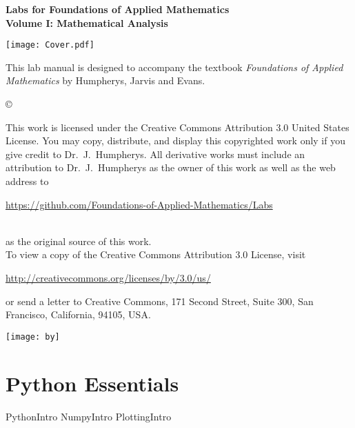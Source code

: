 \documentclass[nociteref]{SIAM-GH-book}
\begin{document}

\thispagestyle{empty} %

\begin{center}
{\huge \bf Labs for Foundations of Applied Mathematics} \\
\vspace{5mm}
{\Large \bf Volume I: Mathematical Analysis}
\vspace{20mm}

\texttt{[image: Cover.pdf]}
\end{center}
\frontmatter



\begin{thepreface} %

This lab manual is designed to accompany the textbook \emph{Foundations of Applied Mathematics} by Humpherys, Jarvis and Evans.

\vfill
\copyright{This work is licensed under the Creative Commons Attribution 3.0 United States
License.  You may copy, distribute, and display this copyrighted work only if you give
credit to Dr.~J.~Humpherys. All derivative works must include an attribution to Dr.~J.~Humpherys as the owner of this work as well as the web address to
\\\centerline{\url{https://github.com/Foundations-of-Applied-Mathematics/Labs}}\\as the original source of this work.
\\To view a copy of the Creative Commons Attribution 3.0 License, visit
\\\centerline{\url{http://creativecommons.org/licenses/by/3.0/us/}} or send a letter to Creative Commons, 171 Second Street, Suite 300, San Francisco, California, 94105, USA.}

\vfill
\centering\texttt{[image: by]}
\vfill
\end{thepreface}

\setcounter{tocdepth}{1}
\tableofcontents

\mainmatter %

\part{Python Essentials} %
{PythonIntro}
{NumpyIntro}
{PlottingIntro}
\end{document}
